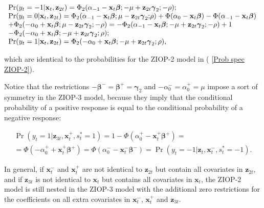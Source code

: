 \documentclass[letterpaper,fleqn,12pt]{article}
\begin{document}
\bigskip

$%
\begin{array}{l}
\Pr (y_{t}=-1|\mathbf{x}_{t},\mathbf{z}_{2t})=\Phi _{2}(\alpha _{-1}-\mathbf{%
x}_{t}\mathbf{\beta };-\mu +\mathbf{z}_{2t}\mathbf{\gamma }_{2}\mathbf{;-}%
\rho ); \\ 
\Pr (y_{t}=0|\mathbf{x}_{t},\mathbf{z}_{2t})=\Phi _{2}(\alpha _{-1}-\mathbf{x%
}_{t}\mathbf{\beta };\mu -\mathbf{z}_{2t}\mathbf{\gamma }_{2}\mathbf{;}\rho
)+\Phi (\alpha _{0}-\mathbf{x}_{t}\mathbf{\beta })-\Phi (\alpha _{-1}-%
\mathbf{x}_{t}\mathbf{\beta }) \\ 
+\Phi _{2}(-\alpha _{0}+\mathbf{x}_{t}\mathbf{\beta };\mu -\mathbf{z}_{2t}%
\mathbf{\gamma }_{2};\mathbf{-}\rho )=-\Phi _{2}(\alpha _{-1}-\mathbf{x}_{t}%
\mathbf{\beta };-\mu +\mathbf{z}_{2t}\mathbf{\gamma }_{2}\mathbf{;-}\rho )+1
\\ 
-\Phi _{2}(-\alpha _{0}+\mathbf{x}_{t}\mathbf{\beta };-\mu +\mathbf{z}_{2t}%
\mathbf{\gamma }_{2};\rho ); \\ 
\Pr (y_{t}=1|\mathbf{x}_{t},\mathbf{z}_{2t})=\Phi _{2}(-\alpha _{0}+\mathbf{x%
}_{t}\mathbf{\beta };-\mu +\mathbf{z}_{2t}\mathbf{\gamma }_{2};\rho ),%
\end{array}%
$

\bigskip

\noindent which are identical to the probabilities for the ZIOP-2 model in (%
\ref{Prob spec ZIOP-2}).

Notice that the restrictions $-\mathbf{\beta }^{-}=\mathbf{\beta }^{+}=%
\mathbf{\gamma }_{2}$ and $-\alpha _{0}^{-}=\alpha _{0}^{+}=\mu $ impose a
sort of symmetry in the ZIOP-3 model, because they imply that the
conditional probability of a positive response is equal to the conditional
probability of a negative response:

\medskip

\begin{gather*}
\Pr (y_{t}=1|\mathbf{z}_{3t},\mathbf{x}_{t}^{+},s_{t}^{\ast }=1)=1-\Phi
(\alpha _{0}^{+}-\mathbf{x}_{t}^{+}\mathbf{\beta }^{+})= \\
=\Phi (-\alpha _{0}^{+}+\mathbf{x}_{t}^{+}\mathbf{\beta }^{+})=\Phi (\alpha
_{0}^{-}-\mathbf{x}_{t}^{-}\mathbf{\beta }^{-})=\Pr (y_{t}=-1|\mathbf{z}_{t},%
\mathbf{x}_{t}^{-},s_{t}^{\ast }=-1)\text{.}
\end{gather*}

\medskip

In general, if $\mathbf{x}_{t}^{-}$ and $\mathbf{x}_{t}^{+}$ are not
identical to $\mathbf{z}_{2t}$ but contain all covariates in $\mathbf{z}%
_{2t} $, and if $\mathbf{z}_{3t}$ is not identical to $\mathbf{x}_{t}$ but
contains all covariates in $\mathbf{x}_{t}$, the ZIOP-2 model is still
nested in the ZIOP-3 model with the additional zero restrictions for the
coefficients on all extra covariates in $\mathbf{x}_{t}^{-}$, $\mathbf{x}%
_{t}^{+}$ and $\mathbf{z}_{3t}$.
\end{document}
